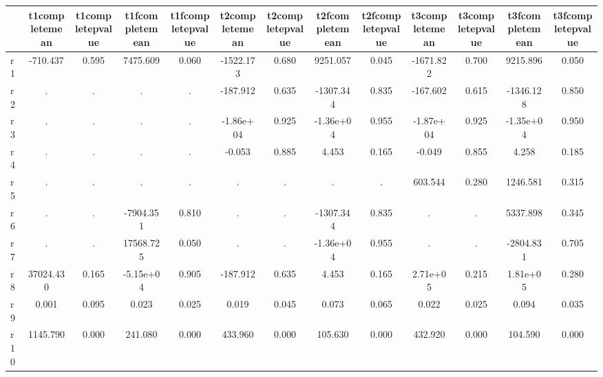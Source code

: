\begin{table}[htbp]
\begin{tabular}{lcccccccccccc} \hline \hline
 & t1completemean  & t1completepvalue  & t1fcompletemean  & t1fcompletepvalue  & t2completemean  & t2completepvalue  & t2fcompletemean  & t2fcompletepvalue  & t3completemean  & t3completepvalue  & t3fcompletemean  & t3fcompletepvalue  \\  \hline 
r1 &  -710.437 &     0.595 &  7475.609 &     0.060 & -1522.173 &     0.680 &  9251.057 &     0.045 & -1671.822 &     0.700 &  9215.896 &     0.050 \\  
r2 &         . &         . &         . &         . &  -187.912 &     0.635 & -1307.344 &     0.835 &  -167.602 &     0.615 & -1346.128 &     0.850 \\  
r3 &         . &         . &         . &         . & -1.86e+04 &     0.925 & -1.36e+04 &     0.955 & -1.87e+04 &     0.925 & -1.35e+04 &     0.950 \\  
r4 &         . &         . &         . &         . &    -0.053 &     0.885 &     4.453 &     0.165 &    -0.049 &     0.855 &     4.258 &     0.185 \\  
r5 &         . &         . &         . &         . &         . &         . &         . &         . &   603.544 &     0.280 &  1246.581 &     0.315 \\  
r6 &         . &         . & -7904.351 &     0.810 &         . &         . & -1307.344 &     0.835 &         . &         . &  5337.898 &     0.345 \\  
r7 &         . &         . & 17568.725 &     0.050 &         . &         . & -1.36e+04 &     0.955 &         . &         . & -2804.831 &     0.705 \\  
r8 & 37024.430 &     0.165 & -5.15e+04 &     0.905 &  -187.912 &     0.635 &     4.453 &     0.165 &  2.71e+05 &     0.215 &  1.81e+05 &     0.280 \\  
r9 &     0.001 &     0.095 &     0.023 &     0.025 &     0.019 &     0.045 &     0.073 &     0.065 &     0.022 &     0.025 &     0.094 &     0.035 \\  
r10 &  1145.790 &     0.000 &   241.080 &     0.000 &   433.960 &     0.000 &   105.630 &     0.000 &   432.920 &     0.000 &   104.590 &     0.000 \\  
\hline \hline \end{tabular}
\end{table}
